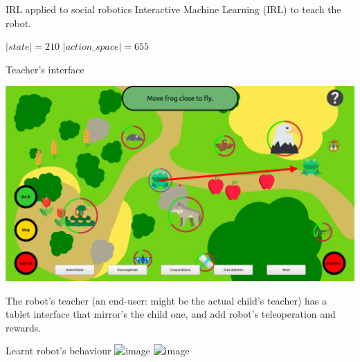 \documentclass[xcolor=table]{beamer}
\begin{document}
{\begin{frame}{IRL applied to social robotics}
    Interactive Machine Learning (IRL) to teach the robot.

    $|state| = 210$ $| action\_space| = 655$

\end{frame}


\begin{frame}{Teacher's interface}
    \begin{center}
        \includegraphics[width=0.9\linewidth]{sparc/woz-gui}
    \end{center}

    The robot's teacher (an end-user: might be the actual child's teacher) has a
    tablet interface that mirror's the child one, and add robot's teleoperation
    and rewards.

\end{frame}




\begin{frame}{Learnt robot's behaviour}
    \includegraphics<1>[width=0.9\linewidth]{sparc/actions-supervised}
    \includegraphics<2>[width=0.9\linewidth]{sparc/actions}




\end{frame}
}
\end{document}
